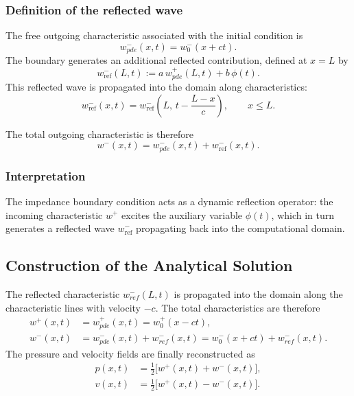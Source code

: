 \documentclass[11pt,a4paper]{report}
\theoremstyle{plain}
\theoremstyle{definition}
\begin{document}
\subsubsection{Definition of the reflected wave}

The free outgoing characteristic associated with the initial condition is
\begin{equation}
    w^-_{pde}(x,t) = w_0^-(x+ct).
\end{equation}
The boundary generates an additional reflected contribution, defined at $x=L$ by
\begin{equation}
    \boxed{
    w^-_{\mathrm{ref}}(L,t)
    :=
    a\, w^+_{pde}(L,t)
    + b\, \phi(t)
    }.
\end{equation}
This reflected wave is propagated into the domain along characteristics:
\begin{equation}
    w^-_{\mathrm{ref}}(x,t)
    =
    w^-_{\mathrm{ref}}
    \!\left(L,\, t - \frac{L-x}{c}\right),
    \qquad x \le L.
\end{equation}

The total outgoing characteristic is therefore
\begin{equation}
    w^-(x,t)
    =
    w^-_{pde}(x,t)
    + w^-_{\mathrm{ref}}(x,t).
\end{equation}

\subsubsection{Interpretation}

The impedance boundary condition acts as a dynamic reflection operator: the incoming
characteristic $w^+$ excites the auxiliary variable $\phi(t)$, which in turn generates
a reflected wave $w^-_{\mathrm{ref}}$ propagating back into the computational domain.

\subsection{Construction of the Analytical Solution}

The reflected characteristic $w^-_{ref}(L,t)$ is propagated into the domain along the characteristic lines with velocity $-c$. The total characteristics are therefore
\begin{align}
    w^+(x,t) &= w^+_{pde}(x,t) = w_0^+(x-ct), \\
    w^-(x,t) &= w^-_{pde}(x,t) + w^-_{ref}(x,t)
             = w_0^-(x+ct) + w^-_{ref}(x,t).
\end{align}
The pressure and velocity fields are finally reconstructed as
\begin{equation}
\begin{aligned}
    p(x,t) &= \tfrac12 \bigl[w^+(x,t) + w^-(x,t)\bigr], \\
    v(x,t) &= \tfrac12 \bigl[w^+(x,t) - w^-(x,t)\bigr].
\end{aligned}
\label{eq:exact_sol}
\end{equation}
\end{document}

